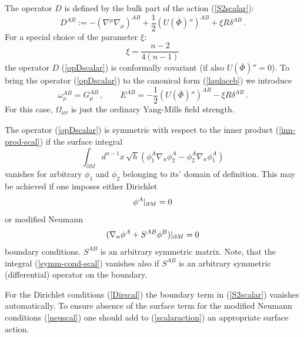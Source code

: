 The operator $D$ is defined by the bulk part of the action
(\ref{S2scalar}):
\begin{equation}
D^{AB}:=-(\nabla^\mu\nabla_\mu )^{AB}
+\frac 12(U(\bar\Phi )'')^{AB} +\xi R \delta^{AB}\,.
\label{opDscalar}
\end{equation}
For a special choice of the parameter $\xi$:
\begin{equation}
\xi =\frac{n-2}{4(n-1)} \label{confxi}
\end{equation}
the operator $D$ (\ref{opDscalar}) is conformally covariant
(if also $U(\bar\Phi )''=0$).
To bring the operator (\ref{opDscalar}) to the canonical form
(\ref{laplaceb}) we introduce
\begin{equation}
\omega_\mu^{AB}=G_\mu^{AB}\, ,\qquad
E^{AB}=-\frac 12(U(\bar\Phi )'')^{AB} -\xi R \delta^{AB}\,.
\label{omEscal}
\end{equation}
For this case, $\Omega_{\mu\nu}$ is just the ordinary Yang-Mills
field strength.

The operator (\ref{opDscalar}) is symmetric with respect to the
inner product (\ref{inn-prod-scal})
if  the surface integral
\begin{equation}
\int_{\partial M} d^{n-1}x\,\sqrt{h} (\phi_1^A\nabla_n\phi_2^A -
\phi_2^A\nabla_n\phi_1^A ) \label{symm-cond-scal}
\end{equation}
vanishes for arbitrary $\phi_1$ and $\phi_2$ belonging to its' 
domain of definition. 
This may be achieved if one imposes either
Dirichlet 
\begin{equation}
\phi^A\vert_{\partial M} =0 \label{Dirscal}
\end{equation}
or modified Neumann 
\begin{equation}
(\nabla_n\phi^A +S^{AB}\phi^B)\vert_{\partial M} =0 \label{neuscal}
\end{equation}
boundary conditions. $S^{AB}$ is an arbitrary symmetric matrix.
Note, that the integral (\ref{symm-cond-scal}) vanishes also if
$S^{AB}$ is an arbitrary symmetric (differential) operator
on the boundary. 

For the Dirichlet conditions (\ref{Dirscal}) the boundary term
in (\ref{S2scalar}) vanishes automatically. To ensure absence
of the surface term for the modified Neumann conditions 
(\ref{neuscal}) one should add to (\ref{scalaraction}) an appropriate
surface action.
